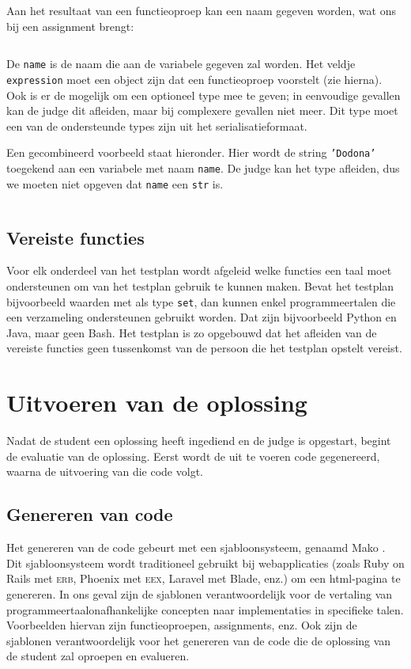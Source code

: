 Aan het resultaat van een functieoproep kan een naam gegeven worden, wat ons bij een assignment brengt:

\inputminted{json}{code/assignment.json}

De \texttt{name} is de naam die aan de variabele gegeven zal worden.
Het veldje \texttt{expression} moet een object zijn dat een functieoproep voorstelt (zie hierna).
Ook is er de mogelijk om een optioneel type mee te geven;
in eenvoudige gevallen kan de judge dit afleiden, maar bij complexere gevallen niet meer.
Dit type moet een van de ondersteunde types zijn uit het serialisatieformaat.

Een gecombineerd voorbeeld staat hieronder.
Hier wordt de string \texttt{'Dodona'} toegekend aan een variabele met naam \texttt{name}.
De judge kan het type afleiden, dus we moeten niet opgeven dat \texttt{name} een \texttt{str} is.

\inputminted{json}{code/assign-variable.json}

\subsection{Vereiste functies}\label{subsec:vereiste-functies}

Voor elk onderdeel van het testplan wordt afgeleid welke functies een taal moet ondersteunen om van het testplan gebruik te kunnen maken.
Bevat het testplan bijvoorbeeld waarden met als type \texttt{set}, dan kunnen enkel programmeertalen die een verzameling ondersteunen gebruikt worden.
Dat zijn bijvoorbeeld Python en Java, maar geen Bash.
Het testplan is zo opgebouwd dat het afleiden van de vereiste functies geen tussenkomst van de persoon die het testplan opstelt vereist.

\section{Uitvoeren van de oplossing}\label{sec:uitvoeren-van-de-oplossing}

Nadat de student een oplossing heeft ingediend en de judge is opgestart, begint de evaluatie van de oplossing.
Eerst wordt de uit te voeren code gegenereerd, waarna de uitvoering van die code volgt.

\subsection{Genereren van code}\label{subsec:genereren-van-code}

Het genereren van de code gebeurt met een sjabloonsysteem, genaamd Mako \autocite{mako}.
Dit sjabloonsysteem wordt traditioneel gebruikt bij webapplicaties (zoals Ruby on Rails met \textsc{erb}, Phoenix met \textsc{eex}, Laravel met Blade, enz.) om een html-pagina te genereren.
In ons geval zijn de sjablonen verantwoordelijk voor de vertaling van programmeertaalonafhankelijke concepten naar implementaties in specifieke talen.
Voorbeelden hiervan zijn functieoproepen, assignments, enz.
Ook zijn de sjablonen verantwoordelijk voor het genereren van de code die de oplossing van de student zal oproepen en evalueren.

